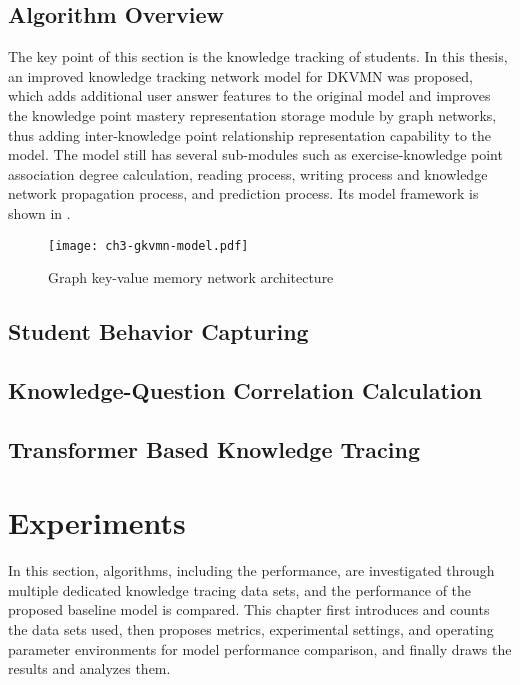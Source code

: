 \subsection{Algorithm Overview}

The key point of this section is the knowledge tracking of students. In this thesis, an improved knowledge tracking network model for DKVMN was proposed, which adds additional user answer features to the original model and improves the knowledge point mastery representation storage module by graph networks, thus adding inter-knowledge point relationship representation capability to the model. The model still has several sub-modules such as exercise-knowledge point association degree calculation, reading process, writing process and knowledge network propagation process, and prediction process. Its model framework is shown in \figname{\ref{fig:ch3-gkvmn-model}}.

\begin{figure}[htbp!]
    \texttt{[image: ch3-gkvmn-model.pdf]}
    \caption{Graph key-value memory network architecture}\label{fig:ch3-gkvmn-model}
\end{figure}

\subsection{Student Behavior Capturing}
\subsection{Knowledge-Question Correlation Calculation}

\subsection{Transformer Based Knowledge Tracing}

\section{Experiments}
In this section, algorithms, including the performance, are investigated through multiple dedicated knowledge tracing data sets, and the performance of the proposed baseline model is compared. This chapter first introduces and counts the data sets used, then proposes metrics, experimental settings, and operating parameter environments for model performance comparison, and finally draws the results and analyzes them.


